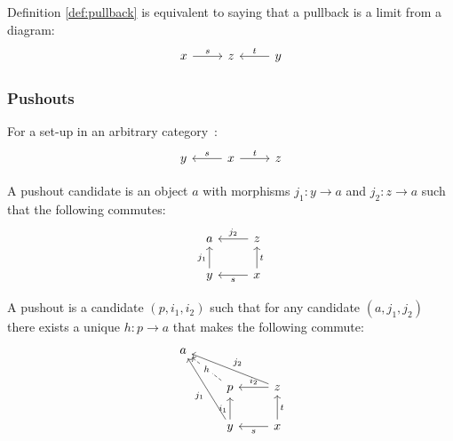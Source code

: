 \begin{definition}
  Definition \ref{def:pullback} is equivalent to saying that a pullback is a
  limit from a diagram:
  \[\begin{tikzcd}[ampersand replacement=\&]
    x \& z \& y
    \arrow["t"', from=1-3, to=1-2]
    \arrow["s", from=1-1, to=1-2]
  \end{tikzcd}\]
\end{definition}

\subsubsection*{Pushouts}

\begin{definition}
  For a set-up in an arbitrary
  category~\parencite{leinster:basic_category_theory}:
  \[\begin{tikzcd}[ampersand replacement=\&]
    y \& x \& z
    \arrow["t", from=1-2, to=1-3]
    \arrow["s"', from=1-2, to=1-1]
  \end{tikzcd}\]

  A pushout candidate is an object $a$ with morphisms $j_1: y \to a$ and $j_2:
  z\to a$ such that the following commutes:
  \[\begin{tikzcd}[ampersand replacement=\&]
    a \& z \\
    y \& x
    \arrow["t"', from=2-2, to=1-2]
    \arrow["s", from=2-2, to=2-1]
    \arrow["{j_1}", from=2-1, to=1-1]
    \arrow["{j_2}"', from=1-2, to=1-1]
  \end{tikzcd}\]

  A pushout is a candidate $(p, i_1, i_2)$ such that for any candidate $(a,
  j_1, j_2)$ there exists a unique $h:p\to a$ that makes the following
  commute:
  \[\begin{tikzcd}[ampersand replacement=\&]
    a \\
    \& p \& z \\
    \& y \& x
    \arrow["t"', from=3-3, to=2-3]
    \arrow["s", from=3-3, to=3-2]
    \arrow["{i_1}", from=3-2, to=2-2]
    \arrow["{i_2}"', from=2-3, to=2-2]
    \arrow["h"{description}, dashed, from=2-2, to=1-1]
    \arrow["{j_1}", from=3-2, to=1-1]
    \arrow["{j_2}"', from=2-3, to=1-1]
  \end{tikzcd}\]
\end{definition}

